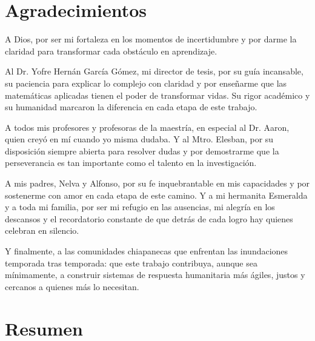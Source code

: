 \documentclass[
  spanish,
  us-letterpaper,
]{scrreprt}
\numberwithin{equation}{section}
\renewcommand*\contentsname{Tabla de contenidos}
\newcommand\contentsname{Tabla de contenidos}
\begin{document}
\chapter*{Agradecimientos}

A Dios, por ser mi fortaleza en los momentos de incertidumbre y por darme la claridad para transformar cada obstáculo en aprendizaje.

Al Dr. Yofre Hernán García Gómez, mi director de tesis, por su guía incansable, su paciencia para explicar lo complejo con claridad y por enseñarme que las matemáticas aplicadas tienen el poder de transformar vidas. Su rigor académico y su humanidad marcaron la diferencia en cada etapa de este trabajo.

A todos mis profesores y profesoras de la maestría, en especial al Dr. Aaron, quien creyó en mí cuando yo misma dudaba. Y al Mtro. Elesban, por su disposición siempre abierta para resolver dudas y por demostrarme que la perseverancia es tan importante como el talento en la investigación.

A mis padres, Nelva y Alfonso, por su fe inquebrantable en mis capacidades y por sostenerme con amor en cada etapa de este camino. Y a mi hermanita Esmeralda y a toda mi familia, por ser mi refugio en las ausencias, mi alegría en los descansos y el recordatorio constante de que detrás de cada logro hay quienes celebran en silencio.

Y finalmente, a las comunidades chiapanecas que enfrentan las inundaciones temporada tras temporada: que este trabajo contribuya, aunque sea mínimamente, a construir sistemas de respuesta humanitaria más ágiles, justos y cercanos a quienes más lo necesitan.



\renewcommand*\contentsname{Tabla de contenidos}
{
\hypersetup{linkcolor=}
\setcounter{tocdepth}{2}
\tableofcontents
}


\chapter{Resumen}\label{resumen}
\end{document}
